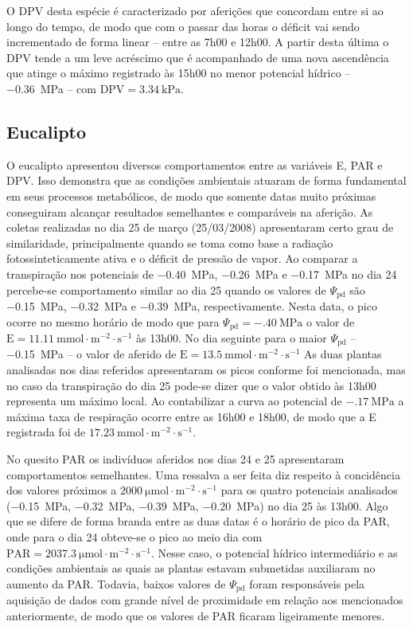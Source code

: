 \documentclass[a4paper, 12pt]{article}
\numberwithin{equation}{section}
\begin{document}
	O DPV desta espécie é caracterizado por aferições que concordam entre si ao longo do tempo, de modo que com o passar das horas o déficit vai sendo incrementado de forma linear -- entre as 7h00 e 12h00. A partir desta última o DPV tende a um leve acréscimo que é acompanhado de uma nova ascendência que atinge o máximo registrado às 15h00 no menor potencial hídrico -- \SI{-.36}{\mega\pascal} -- com $\textrm{DPV}=\SI{3.34}{\kilo\pascal}$.
	
	\subsection{Eucalipto}
	
	O eucalipto apresentou diversos comportamentos entre as variáveis E, PAR e DPV. Isso demonstra que as condições ambientais atuaram de forma fundamental em seus processos metabólicos, de modo que somente datas muito próximas conseguiram alcançar resultados semelhantes e comparáveis na aferição. As coletas realizadas no dia 25 de março (25/03/2008) apresentaram certo grau de similaridade, principalmente quando se toma como base a radiação fotossinteticamente ativa e o déficit de pressão de vapor. Ao comparar a transpiração nos potenciais de \SI{-.40}{\mega\pascal}, \SI{-.26}{\mega\pascal} e \SI{-.17}{\mega\pascal} no dia 24 percebe-se comportamento similar ao dia 25 quando os valores de $\Psi_{\textrm{pd}}$ são \SI{-.15}{\mega\pascal}, \SI{-.32}{\mega\pascal} e \SI{-.39}{\mega\pascal}, respectivamente. Nesta data, o pico ocorre no mesmo horário de modo que para $\Psi_{\textrm{pd}}=\SI{-.40}{\mega\pascal}$ o valor de $\textrm{E}=\SI{11.11}{\milli\mole\cdot\meter^{-2}\cdot\second^{-1}}$ às 13h00. No dia seguinte para o maior $\Psi_{\textrm{pd}}$ -- \SI{-.15}{\mega\pascal} -- o valor de aferido de $\textrm{E}=\SI{13.5}{\milli\mole\cdot\meter^{-2}\cdot\second^{-1}}$ As duas plantas analisadas nos dias referidos apresentaram os picos conforme foi mencionada, mas no caso da transpiração do dia 25 pode-se dizer que o valor obtido às 13h00 representa um máximo local. Ao contabilizar a curva ao potencial de $\SI{-.17}{\mega\pascal}$ a máxima taxa de respiração ocorre entre as 16h00 e 18h00, de modo que a E registrada foi de $\SI{17.23}{\milli\mole\cdot\meter^{-2}\cdot\second^{-1}}$.
	
	No quesito PAR os indivíduos aferidos nos dias 24 e 25 apresentaram comportamentos semelhantes. Uma ressalva a ser feita diz respeito à concidência dos valores próximos a $\SI{2000}{\micro\mole\cdot\meter^{-2}\cdot\second^{-1}}$ para os quatro potenciais analisados (\SI{-.15}{\mega\pascal}, \SI{-.32}{\mega\pascal}, \SI{-.39}{\mega\pascal}, \SI{-.20}{\mega\pascal}) no dia 25 às 13h00. Algo que se difere de forma branda entre as duas datas é o horário  de pico da PAR, onde para o dia 24 obteve-se o pico ao meio dia com $\textrm{PAR}=\SI{2037.3}{\micro\mole\cdot\meter^{-2}\cdot\second^{-1}}$. Nesse caso, o potencial hídrico intermediário e as condições ambientais as quais as plantas estavam submetidas auxiliaram no aumento da PAR. Todavia, baixos valores de $\Psi_{\textrm{pd}}$ foram responsáveis pela aquisição de dados com grande nível de proximidade em relação aos mencionados anteriormente, de modo que os valores de PAR ficaram ligeiramente menores.
	
\end{document}
